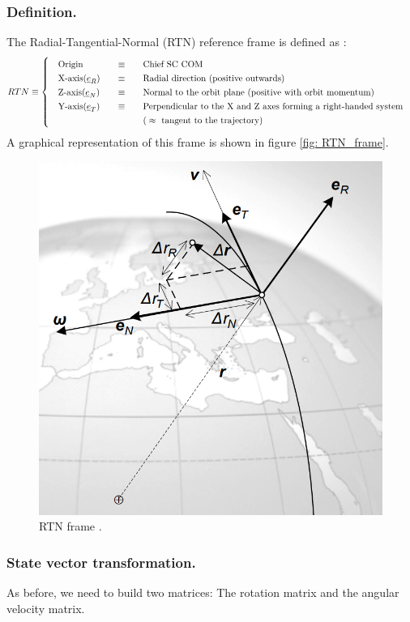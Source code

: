 		\subsubsection{Definition.}
		\indent The Radial-Tangential-Normal (RTN) reference frame is defined as \cite{dAmicoDLR}:
		\[
		\arraycolsep=10pt
		\def\arraystretch{1.3}
		RTN\equiv\left\{
		\begin{array}{lll}
		\text{Origin} 	& \equiv 	& \text{Chief SC COM} \\
		\text{X-axis}(\underline{e}_R) 	& \equiv 	& \text{Radial direction (positive outwards)} \\
		\text{Z-axis}(\underline{e}_N) 	& \equiv 	& \text{Normal to the orbit plane (positive with orbit momentum)} \\
		\text{Y-axis}(\underline{e}_T) 	& \equiv 	& \text{Perpendicular to the X and Z axes forming a right-handed system} \\
									 	& 			& \text{(} \approx \text{ tangent to the trajectory)}
		\end{array}
		\right.
		\]
		\indent A graphical representation of this frame is shown in figure \ref{fig:	RTN_frame}.
		\begin{figure}[!htb]
		\centering\includegraphics[width = 0.4\linewidth]{Appendices/Appendix_B/RTN_frame}
		\caption{RTN frame \cite{dAmicoDLR}.}
		\label{fig:	RTN_frame}
		\end{figure}
		\FloatBarrier
		\subsubsection{State vector transformation.}
		\indent As before, we need to build two matrices: The rotation matrix and the angular velocity matrix. 
